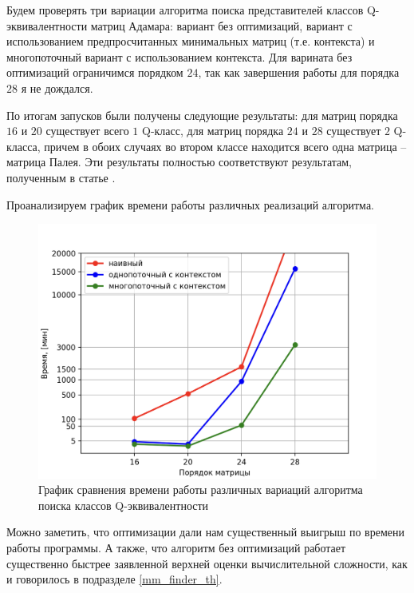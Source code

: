 Будем проверять три вариации алгоритма поиска представителей классов Q-эквивалентности матриц Адамара: вариант без оптимизаций, вариант с использованием предпросчитанных минимальных матриц (т.е. контекста) и многопоточный вариант с использованием контекста. Для варината без оптимизаций ограничимся порядком $24$, так как завершения работы для порядка $28$ я не дождался.

По итогам запусков были получены следующие результаты: для матриц порядка $16$ и $20$ существует всего $1$ Q-класс, для матриц порядка $24$ и $28$ существует $2$ Q-класса, причем в обоих случаях во втором классе находится всего одна матрица -- матрица Палея. Эти результаты полностью соответствуют результатам, полученным в статье \cite{orrick:so}.

Проанализируем график времени работы различных реализаций алгоритма.

\begin{figure}[H]
    \centering
    \includegraphics[scale=0.6]{res/img/plot_result.png}
    \caption{График сравнения времени работы различных вариаций алгоритма поиска классов Q-эквивалентности}
    \label{fig:res_plot}
\end{figure}

Можно заметить, что оптимизации дали нам существенный выигрыш по времени работы программы. А также, что алгоритм без оптимизаций работает существенно быстрее заявленной верхней оценки вычислительной сложности, как и говорилось в подразделе \ref{mm_finder_th}.

\nocite{horadam:hma}